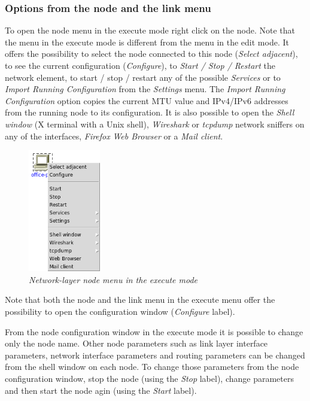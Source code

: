 \subsubsection{Options from the node and the link menu}
\label{sec:NodeandLinkMenuOptions}
To open the node menu in the execute mode right click on the node. Note that
the menu in the execute mode is different from the menu in the edit mode. It
offers the possibility to select the node connected to this node (\emph{Select
adjacent}), to see the current configuration (\emph{Configure}), to \emph{Start
/ Stop / Restart} the network element, to start / stop / restart any of the
possible \emph{Services} or to \emph{Import Running Configuration} from the
\emph{Settings} menu. The \emph{Import Running Configuration} option copies the
current MTU value and IPv4/IPv6 addresses from the running node to its
configuration. It is also possible to open the \emph{Shell window} (X terminal
with a Unix shell), \emph{Wireshark} or \emph{tcpdump} network sniffers on any
of the interfaces, \emph{Firefox} \emph{Web Browser} or a \emph{Mail client}.

\begin{figure}[H]
\centering
\vspace{10pt}
\includegraphics[width=0.28\textwidth]{./images/execute_menu.png}
\caption{\emph{Network-layer node menu in the execute mode}}
\label{fig:execute_menu}
\end{figure}

Note that both the node and the link menu in the execute menu offer the
possibility to open the configuration window (\emph{Configure} label). 

From the node configuration window in the execute mode it is possible to change
only the node name. Other node parameters such as link layer interface
parameters, network interface parameters and routing parameters can be changed
from the shell window on each node. To change those parameters from the node
configuration window, stop the node (using the \emph{Stop} label), change
parameters and then start the node agin (using the \emph{Start} label).


